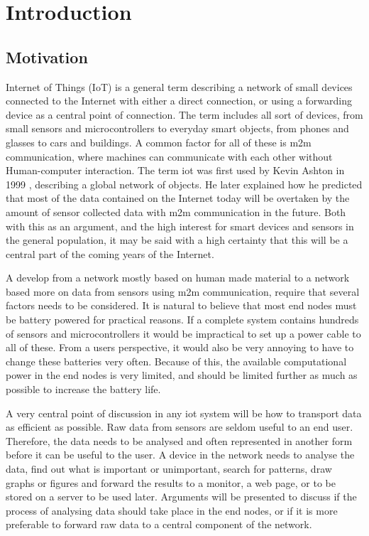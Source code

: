 \chapter{Introduction}
\label{chp:introduction} 


\section{Motivation}

\noindent Internet of Things (IoT) is a general term describing a network of small devices connected to the Internet with either a direct connection, or using a forwarding device as a central point of connection. The term includes all sort of devices, from small sensors and microcontrollers to everyday smart objects, from phones and glasses to cars and buildings. A common factor for all of these is \gls{m2m} communication, where machines can communicate with each other without Human-computer interaction. The term \gls{iot} was first used by Kevin Ashton in 1999 \cite{ashton2009internet}, describing a global network of objects. He later explained how he predicted that most of the data contained on the Internet today will be overtaken by the amount of sensor collected data with \gls{m2m} communication in the future. Both with this as an argument, and the high interest for smart devices and sensors in the general population, it may be said with a high certainty that this will be a central part of the coming years of the Internet. 

\noindent A develop from a network mostly based on human made material to a network based more on data from sensors using \gls{m2m} communication, require that several factors needs to be considered. It is natural to believe that most end nodes must be battery powered for practical reasons. If a complete system contains hundreds of sensors and \glspl{microcontroller} it would be impractical to set up a power cable to all of these. From a users perspective, it would also be very annoying to have to change these batteries very often. Because of this, the available computational power in the end nodes is very limited, and should be limited further as much as possible to increase the battery life. 

\noindent A very central point of discussion in any \gls{iot} system will be how to transport data as efficient as possible. Raw data from sensors are seldom useful to an end user. Therefore, the data needs to be analysed and often represented in another form before it can be useful to the user. A device in the network needs to analyse the data, find out what is important or unimportant, search for patterns, draw graphs or figures and forward the results to a monitor, a web page, or to be stored on a server to be used later. Arguments will be presented to discuss if the process of analysing data should take place in the end nodes, or if it is more preferable to forward raw data to a central component of the network. 


